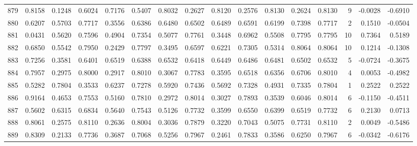 \begin{tabular}{lrrrrrrrrrrrrrrr}
879 &      0.8158 &  0.1248 &  0.6024 &  0.7176 &  0.5407 &  0.8032 &  0.2627 &  0.8120 &  0.2576 &  0.8130 &   0.2624 &     0.8130 &      9 &                   -0.0028 &                    -0.6910 \\
880 &      0.6207 &  0.5703 &  0.7717 &  0.3556 &  0.6386 &  0.6480 &  0.6502 &  0.6489 &  0.6591 &  0.6199 &   0.7398 &     0.7717 &      2 &                    0.1510 &                    -0.0504 \\
881 &      0.0431 &  0.5620 &  0.7596 &  0.4904 &  0.7354 &  0.5077 &  0.7761 &  0.3448 &  0.6962 &  0.5508 &   0.7795 &     0.7795 &     10 &                    0.7364 &                     0.5189 \\
882 &      0.6850 &  0.5542 &  0.7950 &  0.2429 &  0.7797 &  0.3495 &  0.6597 &  0.6221 &  0.7305 &  0.5314 &   0.8064 &     0.8064 &     10 &                    0.1214 &                    -0.1308 \\
883 &      0.7256 &  0.3581 &  0.6401 &  0.6519 &  0.6388 &  0.6532 &  0.6418 &  0.6449 &  0.6486 &  0.6481 &   0.6502 &     0.6532 &      5 &                   -0.0724 &                    -0.3675 \\
884 &      0.7957 &  0.2975 &  0.8000 &  0.2917 &  0.8010 &  0.3067 &  0.7783 &  0.3595 &  0.6518 &  0.6356 &   0.6706 &     0.8010 &      4 &                    0.0053 &                    -0.4982 \\
885 &      0.5282 &  0.7804 &  0.3533 &  0.6237 &  0.7278 &  0.5920 &  0.7436 &  0.5692 &  0.7328 &  0.4931 &   0.7335 &     0.7804 &      1 &                    0.2522 &                     0.2522 \\
886 &      0.9164 &  0.4653 &  0.7553 &  0.5160 &  0.7810 &  0.2972 &  0.8014 &  0.3027 &  0.7893 &  0.3539 &   0.6046 &     0.8014 &      6 &                   -0.1150 &                    -0.4511 \\
887 &      0.5602 &  0.6315 &  0.6834 &  0.5640 &  0.7543 &  0.5126 &  0.7732 &  0.3599 &  0.6550 &  0.6399 &   0.6519 &     0.7732 &      6 &                    0.2130 &                     0.0713 \\
888 &      0.8061 &  0.2575 &  0.8110 &  0.2636 &  0.8004 &  0.3036 &  0.7879 &  0.3220 &  0.7043 &  0.5075 &   0.7731 &     0.8110 &      2 &                    0.0049 &                    -0.5486 \\
889 &      0.8309 &  0.2133 &  0.7736 &  0.3687 &  0.7068 &  0.5256 &  0.7967 &  0.2461 &  0.7833 &  0.3586 &   0.6250 &     0.7967 &      6 &                   -0.0342 &                    -0.6176 \\

\end{tabular}
